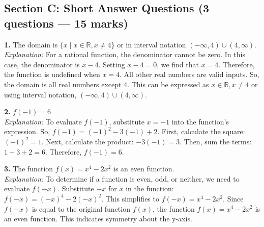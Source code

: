 \documentclass[12pt,a4paper]{article}
\begin{document}
\subsection*{Section C: Short Answer Questions \normalfont\small (3 questions --- 15 marks)}
\vspace{4pt}
\begin{answerbox}
\noindent\textbf{1.} The domain is $\{x \mid x \in \mathbb{R}, x \ne 4\}$ or in interval notation $(-\infty, 4) \cup (4, \infty)$.
\\ \noindent\textit{Explanation:} For a rational function, the denominator cannot be zero. In this case, the denominator is $x-4$. Setting $x-4 = 0$, we find that $x=4$. Therefore, the function is undefined when $x=4$. All other real numbers are valid inputs. So, the domain is all real numbers except 4. This can be expressed as $x \in \mathbb{R}, x \ne 4$ or using interval notation, $(-\infty, 4) \cup (4, \infty)$.
\end{answerbox}
\vspace{4pt}
\begin{answerbox}
\noindent\textbf{2.} $f(-1) = 6$
\\ \noindent\textit{Explanation:} To evaluate $f(-1)$, substitute $x = -1$ into the function's expression. So, $f(-1) = (-1)^2 - 3(-1) + 2$. First, calculate the square: $(-1)^2 = 1$. Next, calculate the product: $-3(-1) = 3$. Then, sum the terms: $1 + 3 + 2 = 6$. Therefore, $f(-1) = 6$.
\end{answerbox}
\vspace{4pt}
\begin{answerbox}
\noindent\textbf{3.} The function $f(x) = x^4 - 2x^2$ is an even function.
\\ \noindent\textit{Explanation:} To determine if a function is even, odd, or neither, we need to evaluate $f(-x)$. Substitute $-x$ for $x$ in the function: $f(-x) = (-x)^4 - 2(-x)^2$. This simplifies to $f(-x) = x^4 - 2x^2$. Since $f(-x)$ is equal to the original function $f(x)$, the function $f(x) = x^4 - 2x^2$ is an even function. This indicates symmetry about the y-axis.
\end{answerbox}
\vspace{4pt}
\end{document}
